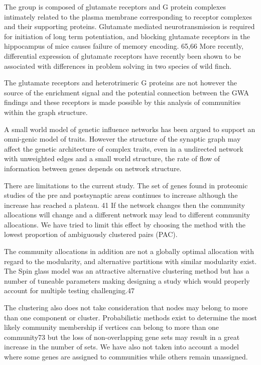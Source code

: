 The group is composed of glutamate receptors and G protein complexes intimately related to the plasma membrane corresponding to receptor complexes and their supporting proteins. Glutamate mediated neurotransmission is required for initiation of long term potentiation, and blocking glutamate receptors in the hippocampus of mice causes failure of memory encoding. 65,66  More recently, differential expression of glutamate receptors have recently been shown to be associated with differences in problem solving in two species of wild finch. \cite{audet2018divergence}  

The glutamate receptors and heterotrimeric G proteins are not however the source of the enrichment signal and the potential connection between the GWA findings and these receptors is made possible by this analysis of communities within the graph structure.

A small world model of genetic influence networks has been argued to support an omni-genic model of traits. \cite{boyle2017expanded}  However the structure of the synaptic graph may affect the genetic architecture of complex traits, even in a undirected network with unweighted edges and a small world structure, the rate of flow of information between genes depends on network structure. 

There are limitations to the current study. The set of genes found in proteomic studies of the pre and postsynaptic areas continues to increase although the \cite{heil2018systems} increase has reached a plateau. 41  If the network changes then the community allocations will change and a different network may lead to different community allocations. We have tried to limit this effect by choosing the method with the lowest proportion of ambiguously clustered pairs (PAC).

The community allocations in addition are not a globally optimal allocation with regard to the modularity, and alternative partitions with similar modularity exist. The Spin glass model was an attractive alternative clustering method but has a number of tuneable parameters making designing a study which would properly account for multiple testing challenging.47 

The clustering also does not take consideration that nodes may belong to more than one component or cluster. Probabilistic methods exist to determine the most likely community membership if vertices can belong to more than one community73 but the loss of non-overlapping gene sets may result in a great increase in the number of sets. We have also not taken into account a model where some genes are assigned to communities while others remain unassigned.

